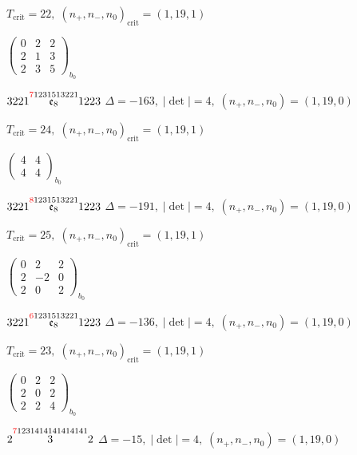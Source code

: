 \documentclass[10pt]{article}
\begin{document}
\hspace{1em}$T_{\text{crit}}=22,\; (n_+,n_-,n_0)_{\text{crit}}=(1,19,1)$

\hspace{2em}$\left(\begin{smallmatrix}0 & 2 & 2 \\ 2 & 1 & 3 \\ 2 & 3 & 5\end{smallmatrix}\right)_{\!b_0}$

$3221\overset{\textcolor{red}{7}1231513221}{\mathfrak{e}_8}1223$ \quad $\Delta=-163,\; |\det|=4,\; (n_+,n_-,n_0)=(1,19,0)$

\hspace{1em}$T_{\text{crit}}=24,\; (n_+,n_-,n_0)_{\text{crit}}=(1,19,1)$

\hspace{2em}$\left(\begin{smallmatrix}4 & 4 \\ 4 & 4\end{smallmatrix}\right)_{\!b_0}$

$3221\overset{\textcolor{red}{8}1231513221}{\mathfrak{e}_8}1223$ \quad $\Delta=-191,\; |\det|=4,\; (n_+,n_-,n_0)=(1,19,0)$

\hspace{1em}$T_{\text{crit}}=25,\; (n_+,n_-,n_0)_{\text{crit}}=(1,19,1)$

\hspace{2em}$\left(\begin{smallmatrix}0 & 2 & 2 \\ 2 & -2 & 0 \\ 2 & 0 & 2\end{smallmatrix}\right)_{\!b_0}$

$3221\overset{\textcolor{red}{6}1231513221}{\mathfrak{e}_8}1223$ \quad $\Delta=-136,\; |\det|=4,\; (n_+,n_-,n_0)=(1,19,0)$

\hspace{1em}$T_{\text{crit}}=23,\; (n_+,n_-,n_0)_{\text{crit}}=(1,19,1)$

\hspace{2em}$\left(\begin{smallmatrix}0 & 2 & 2 \\ 2 & 0 & 2 \\ 2 & 2 & 4\end{smallmatrix}\right)_{\!b_0}$

\smallskip

$2\overset{\textcolor{red}{7}1231414141414141}{3}2$ \quad $\Delta=-15,\; |\det|=4,\; (n_+,n_-,n_0)=(1,19,0)$
\end{document}
